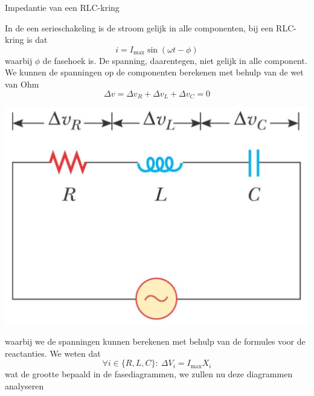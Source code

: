 \newpage

\begin{theo}{Impedantie van een RLC-kring}
    \begin{minipage}{.68\textwidth}
        In de een serieschakeling is de stroom gelijk in alle componenten, bij een RLC-kring is dat
        \begin{equation*}
            i = I_{\max}\sin(\omega t - \phi)
        \end{equation*}
        waarbij $\phi$ de fasehoek is. De spanning, daarentegen, niet gelijk in alle component. We kunnen de spanningen op de componenten berekenen met behulp van de wet van Ohm
        \begin{equation*}
            \Delta v = \Delta v_{R} + \Delta v_{L} + \Delta v_{C} = 0
        \end{equation*}
    \end{minipage}
    \hspace{0.1cm}\vspace{-0.1cm}
    \begin{minipage}{.28\textwidth}
        \includegraphics[scale = 0.2]{Images/Magnetisme/RLCWisselstroomkring}
    \end{minipage}

    \vspace{0.3cm}
    \noindent waarbij we de spanningen kunnen berekenen met behulp van de formules voor de reactanties. We weten dat
    \begin{equation*}
        \forall i \in \{R,L,C\}: \ \Delta V_i = I_{\text{max}}X_i
    \end{equation*}
    wat de grootte bepaald in de fasediagrammen, we zullen nu deze diagrammen analyseren


\end{theo}
